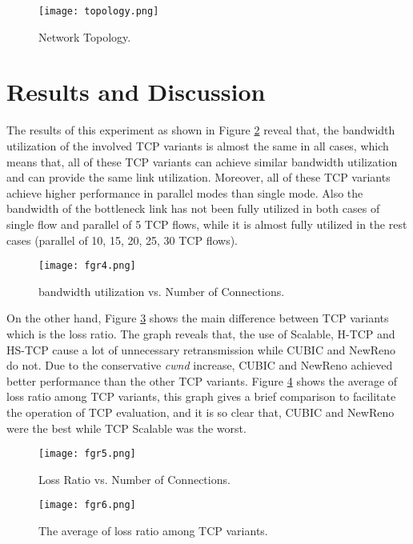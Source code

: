\documentclass[a4paper, conference]{IEEEtran}
\begin{document}
\begin{figure}[h]
\centerline{\texttt{[image: topology.png]}} 
\caption{Network Topology.}
\label{topo}
\end{figure}

\section{Results and Discussion}

The results of this experiment as shown in Figure \ref{throughput} reveal that, the bandwidth utilization of the involved TCP variants is almost the same in all cases, which means that, all of these TCP variants can achieve similar bandwidth utilization and can provide the same link utilization. Moreover, all of these TCP variants achieve higher performance in parallel modes than single mode. Also the bandwidth of the bottleneck link has not been fully utilized in both cases of single flow and parallel of 5 TCP flows, while it is almost fully utilized in the rest cases (parallel of 10, 15, 20, 25, 30 TCP flows).

\begin{figure}[h]
\centerline{\texttt{[image: fgr4.png]}} 
\caption{bandwidth utilization vs. Number of Connections.}
\label{throughput}
\end{figure}

On the other hand, Figure \ref{loss} shows the main difference between TCP variants which is the loss ratio. The graph reveals that, the use of Scalable, H-TCP and HS-TCP cause a lot of unnecessary retransmission while CUBIC and NewReno do not. Due to the conservative \textit{cwnd} increase, CUBIC and NewReno achieved better performance than the other TCP variants. Figure \ref{avg-loss} shows the average of loss ratio among TCP variants, this graph gives a brief comparison to facilitate the operation of TCP evaluation, and it is so clear that, CUBIC and NewReno were the best while TCP Scalable was the worst.

\begin{figure}[h]
\centerline{\texttt{[image: fgr5.png]}} 
\caption{Loss Ratio vs. Number of Connections.}
\label{loss}
\end{figure}

\begin{figure}[h]
\centerline{\texttt{[image: fgr6.png]}} 
\caption{The average of loss ratio among TCP variants.}
\label{avg-loss}
\end{figure}
\end{document}

